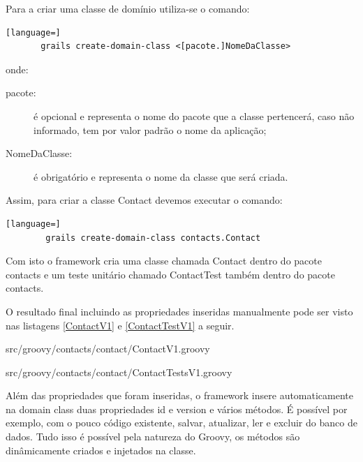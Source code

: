 \documentclass[12pt]{article}
\begin{document}
    Para a criar uma classe de domínio utiliza-se o comando: 

    \begin{lstlisting}[language=]
       grails create-domain-class <[pacote.]NomeDaClasse>
    \end{lstlisting}
    
    onde:
    
    \begin{description}
        \item[pacote:] é opcional e representa o nome do pacote que a classe 
                      pertencerá, caso não informado, tem por valor padrão o nome
                      da aplicação;
        \item[NomeDaClasse:] é obrigatório e representa o nome da classe que será
                             criada.
    \end{description}
    
    Assim, para criar a classe Contact devemos executar o comando:
    
    \begin{lstlisting}[language=]
        grails create-domain-class contacts.Contact
    \end{lstlisting}
    
    Com isto o framework cria uma classe chamada Contact dentro do pacote contacts 
    e um teste unitário chamado ContactTest também dentro do pacote contacts.
    
    O resultado final incluindo as propriedades inseridas manualmente pode ser visto
    nas listagens \ref{ContactV1} e \ref{ContactTestV1} a seguir.
    
    
                    {src/groovy/contacts/contact/ContactV1.groovy}

   
                    {src/groovy/contacts/contact/ContactTestsV1.groovy}

    Além das propriedades que foram inseridas, o framework insere automaticamente
    na domain class duas propriedades id e version e vários métodos. É possível
    por exemplo, com o pouco código existente, salvar, atualizar, ler e excluir do
    banco de dados. Tudo isso é possível pela natureza do Groovy, os métodos são 
    dinâmicamente criados e injetados na classe.
    
\end{document}
